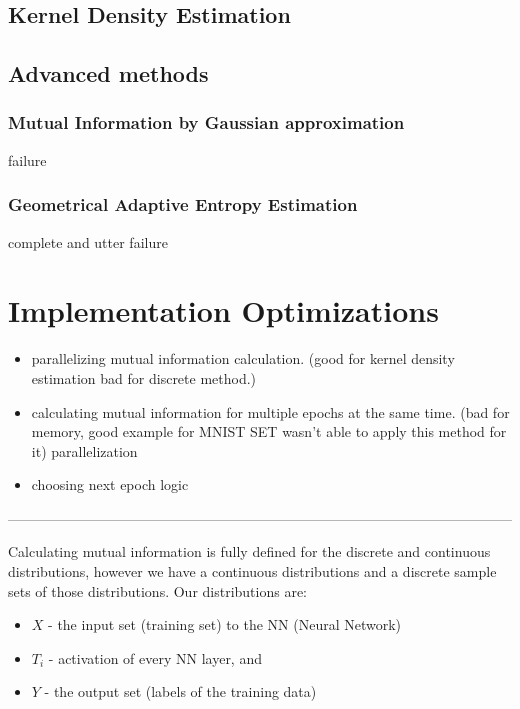 \subsection{Kernel Density Estimation}

\subsection{Advanced methods} \label{ssection:advanced}
\subsubsection{Mutual Information by Gaussian approximation}
  failure
\subsubsection{Geometrical Adaptive Entropy Estimation}
  complete and utter failure

\section{Implementation Optimizations}


\begin{itemize}
  \item{
      parallelizing mutual information calculation. (good for kernel density
      estimation bad for discrete method.)
    }
  \item{
      calculating mutual information for multiple epochs at the same time. (bad
      for memory, good example for MNIST SET wasn't able to apply this method
      for it)
     parallelization
    }
  \item{
     choosing next epoch logic
    }
\end{itemize}



------------------------------------------------------------------------------------------------------------


Calculating mutual information is fully defined for the discrete and continuous
distributions, however we have a continuous distributions and a discrete sample
sets of those distributions. Our distributions are:
\begin{itemize}
  \item{
      $X$ - the input set (training set) to the NN (Neural Network)
    }
  \item{
      $T_i$ - activation of every NN layer, and
    }
  \item{
      $Y$ - the output set (labels of the training data)
    }
\end{itemize}


